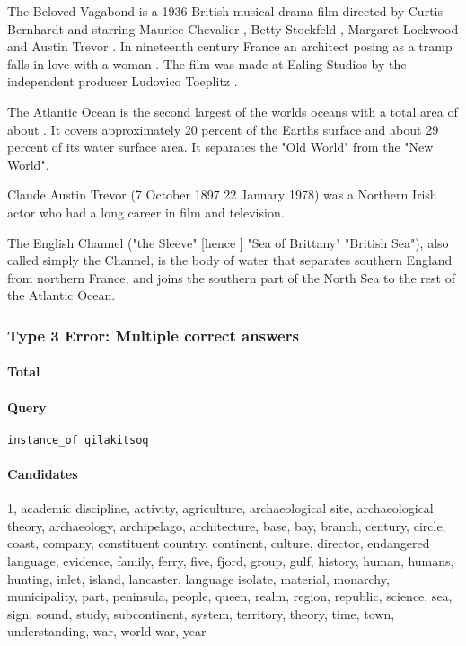 \documentclass{article} \usepackage{iclr2019_conference,times}
\begin{document}
The Beloved Vagabond is a 1936 British musical drama film directed by Curtis Bernhardt and starring Maurice Chevalier , Betty Stockfeld , Margaret Lockwood and Austin Trevor . In nineteenth century France an architect posing as a tramp falls in love with a woman . The film was made at Ealing Studios by the independent producer Ludovico Toeplitz .

The Atlantic Ocean is the second largest of the worlds oceans with a total area of about . It covers approximately 20 percent of the Earths surface and about 29 percent of its water surface area. It separates the "Old World" from the "New World".

Claude Austin Trevor (7 October 1897  22 January 1978) was a Northern Irish actor who had a long career in film and television.

The English Channel ("the Sleeve" [hence ] "Sea of Brittany" "British Sea"), also called simply the Channel, is the body of water that separates southern England from northern France, and joins the southern part of the North Sea to the rest of the Atlantic Ocean.


\subsubsection{Type 3 Error: Multiple correct answers}

\paragraph{Total}


\paragraph{Query} \texttt{instance\_of qilakitsoq}

\paragraph{Candidates} 1, academic discipline, activity, agriculture, archaeological site, archaeological theory, archaeology, archipelago, architecture, base, bay, branch, century, circle, coast, company, constituent country, continent, culture, director, endangered language, evidence, family, ferry, five, fjord, group, gulf, history, human, humans, hunting, inlet, island, lancaster, language isolate, material, monarchy, municipality, part, peninsula, people, queen, realm, region, republic, science, sea, sign, sound, study, subcontinent, system, territory, theory, time, town, understanding, war, world war, year
\end{document}
